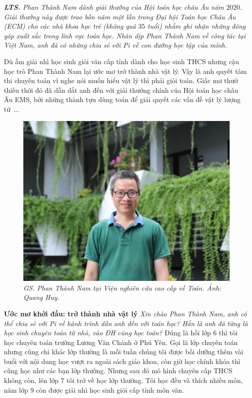 \textit{\textbf{\color{diendantoanhoc}LTS.} Phan Thành Nam dành giải thưởng của Hội toán học châu Âu năm $2020$. Giải thưởng này được trao bốn năm một lần trong Đại hội Toán học Châu Âu (ECM) cho các nhà khoa học trẻ (không quá $35$ tuổi) nhằm ghi nhận những đóng góp xuất sắc trong lĩnh vực toán học. Nhân dịp Phan Thành Nam về công tác tại Việt Nam, anh đã có những chia sẻ với Pi về con đường học tập của mình.}
\begin{multicols}{2}
	Dù ẵm giải nhì học sinh giỏi văn cấp tỉnh dành cho học sinh THCS nhưng cậu học trò Phan Thành Nam lại ước mơ trở thành nhà vật lý. Vậy là anh quyết tâm thi chuyên toán vì nghe nói muốn hiểu vật lý thì phải giỏi toán. Giấc mơ thưở thiếu thời đó đã dẫn dắt anh đến với giải thưởng chính của Hội toán học châu Âu EMS, bởi những thành tựu dùng toán để giải quyết các vấn đề vật lý lượng tử~...
	\begin{figure}[H]
		\centering
		\vspace*{-5pt}
		\captionsetup{labelformat= empty, justification=centering}
		\includegraphics[width=1\linewidth]{1}
		\caption{\small\textit{\color{diendantoanhoc}GS. Phan Thành Nam tại Viện nghiên cứu cao cấp về Toán. Ảnh: Quang Huy.}}
		\vspace*{-10pt}
	\end{figure}
	\textbf{\color{diendantoanhoc}Ước mơ khởi đầu: trở thành nhà vật lý}
	\vskip 0.1cm
	\textit{Xin chào Phan Thành Nam, anh có thể chia sẻ với Pi về hành trình dẫn anh đến với toán học? Hẳn là anh đã từng là học sinh chuyên toán từ nhỏ, vào ĐH cũng học toán?}
	\vskip 0.1cm
	Đúng là hồi lớp $6$ thì tôi học chuyên toán trường Lương Văn Chánh ở Phú Yên. Gọi là lớp chuyên toán nhưng cũng chỉ khác lớp thường là mỗi tuần chúng tôi được bồi dưỡng thêm vài buổi với nội dung học vượt ra ngoài sách giáo khoa, còn giờ học chính khóa thì cũng học như các bạn lớp thường. Nhưng sau đó mô hình chuyên cấp THCS không còn, lên lớp $7$ tôi trở về học lớp thường. Tôi học đều và thích nhiều môn, năm lớp $9$ còn được giải nhì học sinh giỏi cấp tỉnh môn văn.

\end{multicols}
